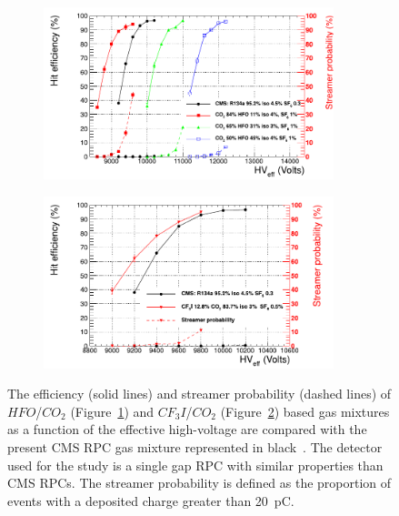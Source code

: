 	\begin{figure}[H]
		\hspace*{-0.1\linewidth}
		\begin{subfigure}{0.6\linewidth}
			\centering
			\includegraphics[height=5cm]{fig/chapt3/HFO-mixture.pdf}
			\caption{\label{fig:RPC-eco:A}}
		\end{subfigure}
		\begin{subfigure}{0.6\linewidth}
			\centering
			\includegraphics[height=5cm]{fig/chapt3/CF3I-mixture.pdf}
			\caption{\label{fig:RPC-eco:B}}
		\end{subfigure}
		\caption{\label{fig:RPC-eco} The efficiency (solid lines) and streamer probability (dashed lines) of $HFO$/$CO_2$ (Figure~\ref{fig:RPC-eco:A}) and $CF_3I$/$CO_2$ (Figure~\ref{fig:RPC-eco:B}) based gas mixtures as a function of the effective high-voltage are compared with the present CMS RPC gas mixture represented in black~\cite{PHASEIITP}. The detector used for the study is a single gap RPC with similar properties than CMS RPCs. The streamer probability is defined as the proportion of events with a deposited charge greater than \SI{20}{pC}.}
	\end{figure}

\begingroup\setlength{\intextsep}{0pt}\setlength{\columnsep}{15pt}

